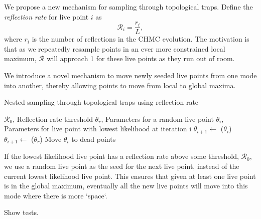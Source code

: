 \documentclass[11pt]{article}
\begin{document}
    We propose a new mechanism for sampling through topological traps.
    Define the \emph{reflection rate} for live point $i$ as
    \begin{equation}\label{eq:reflect_rate}
        \mathcal{R}_i = \frac{r_i}{L},
    \end{equation}
    where $r_i$ is the number of reflections in the CHMC evolution.
    The motivation is that as we repeatedly resample points in an ever more constrained local maximum,
    $\mathcal{R}$ will approach 1 for these live points as they run out of room.

    We introduce a novel mechanism to move newly seeded live points from one mode into
    another, thereby allowing points to move from local to global maxima.

    \begin{algorithm}
        \caption{Nested sampling through topological traps using reflection rate}
        \label{alg:reflection_rate}
        \begin{algorithmic}
            \VARIABLES
            \STATE $\mathcal{R}_0$, Reflection rate threshold
            \STATE $\theta_r$, Parameters for a random live point
            \ENDVARIABLES
            \STATE
            \STATE $\theta_i$, Parameters for live point with lowest likelihood at iteration i
            \STATE $\theta_{i+1} \gets$ ($\theta_i$)
            \ELSE
            \STATE $\theta_{i+1} \gets$ ($\theta_r$)
            \ENDIF
            \STATE Move $\theta_i$ to dead points
        \end{algorithmic}
    \end{algorithm}

    If the lowest likelihood live point has a reflection rate above some threshold, $\mathcal{R}_0$, we use a
    random live point as the seed for the next live point, instead of the current lowest likelihood live point.
    This ensures that given at least one live point is in the global maximum, eventually all the new live points will move
    into this mode where there is more `space`.

    Show tests.
\end{document}
